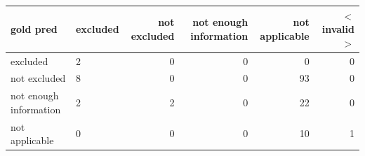 \begin{tabular}{llrrrr}
\toprule
gold  pred & excluded & not excluded & not enough information & not applicable & $<$invalid$>$ \\
\midrule
excluded & 2 & 0 & 0 & 0 & 0 \\
not excluded & 8 & 0 & 0 & 93 & 0 \\
not enough information & 2 & 2 & 0 & 22 & 0 \\
not applicable & 0 & 0 & 0 & 10 & 1 \\
\bottomrule
\end{tabular}
